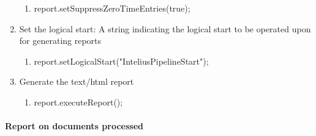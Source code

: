 \begin{enumerate}
\begin{enumerate}
    \item report.setSuppressZeroTimeEntries(true);
  \end{enumerate}
  \item Set the logical start: A string indicating 
    the logical start to be operated upon for generating reports
  \begin{enumerate}
    \item report.setLogicalStart("InteliusPipelineStart");
  \end{enumerate}
  \item Generate the text/html report
  \begin{enumerate}
    \item report.executeReport();
  \end{enumerate}
\end{enumerate}

\paragraph*{Report on documents processed}

